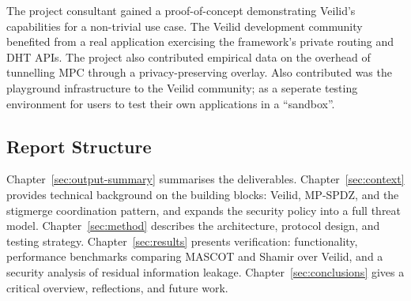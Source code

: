 The project consultant gained a proof-of-concept demonstrating Veilid's
capabilities for a non-trivial use case.  The Veilid development community
benefited from a real application exercising the framework's private routing
and DHT APIs.  The project also contributed empirical data on the overhead of
tunnelling MPC through a privacy-preserving overlay. Also contributed was the 
playground infrastructure to the Veilid community; as a seperate testing environment
for users to test their own applications in a ``sandbox''.

\subsection{Report Structure}
\label{sec:intro-structure}

Chapter~\ref{sec:output-summary} summarises the deliverables.
Chapter~\ref{sec:context} provides technical background on the building
blocks: Veilid, MP-SPDZ, and the stigmerge coordination pattern, and expands
the security policy into a full threat model.
Chapter~\ref{sec:method} describes the architecture, protocol design, and
testing strategy.  Chapter~\ref{sec:results} presents verification:
functionality, performance benchmarks comparing MASCOT and Shamir over Veilid,
and a security analysis of residual information leakage.
Chapter~\ref{sec:conclusions} gives a critical overview, reflections, and
future work.


